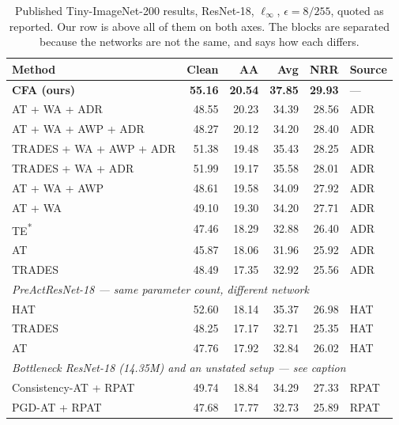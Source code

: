 \documentclass{article} %
\theoremstyle{plain}
\begin{document}
\begin{table}[!htbp]
  \centering \small \setlength{\tabcolsep}{4.5pt}
  \caption{Published Tiny-ImageNet-200 results, ResNet-18, $\ell_\infty$, $\epsilon = 8/255$, quoted as
  reported. Our row is above all of them on both axes. The blocks are separated because the networks
  are not the same, and  says how each differs.}
  \label{tab:published_tin}
  \begin{tabular}{lrrrrl}
    \toprule
    Method & Clean & AA & Avg & NRR & Source \\
    \midrule
    \textbf{CFA (ours)}        & \textbf{55.16} & \textbf{20.54} & \textbf{37.85} & \textbf{29.93} & --- \\
    \midrule
    AT + WA + ADR              & 48.55 & 20.23 & 34.39 & 28.56 & ADR \\
    AT + WA + AWP + ADR        & 48.27 & 20.12 & 34.20 & 28.40 & ADR \\
    TRADES + WA + AWP + ADR    & 51.38 & 19.48 & 35.43 & 28.25 & ADR \\
    TRADES + WA + ADR          & 51.99 & 19.17 & 35.58 & 28.01 & ADR \\
    AT + WA + AWP              & 48.61 & 19.58 & 34.09 & 27.92 & ADR \\
    AT + WA                    & 49.10 & 19.30 & 34.20 & 27.71 & ADR \\
    TE\textsuperscript{*}      & 47.46 & 18.29 & 32.88 & 26.40 & ADR \\
    AT                         & 45.87 & 18.06 & 31.96 & 25.92 & ADR \\
    TRADES                     & 48.49 & 17.35 & 32.92 & 25.56 & ADR \\
    \midrule
    \multicolumn{6}{l}{\emph{PreActResNet-18 --- same parameter count, different network}} \\
    HAT                        & 52.60 & 18.14 & 35.37 & 26.98 & HAT \\
    TRADES                     & 48.25 & 17.17 & 32.71 & 25.35 & HAT \\
    AT                         & 47.76 & 17.92 & 32.84 & 26.02 & HAT \\
    \midrule
    \multicolumn{6}{l}{\emph{Bottleneck ResNet-18 (14.35M) and an unstated setup --- see caption}} \\
    Consistency-AT + RPAT      & 49.74 & 18.84 & 34.29 & 27.33 & RPAT \\
    PGD-AT + RPAT              & 47.68 & 17.77 & 32.73 & 25.89 & RPAT \\

\end{tabular}
\end{table}
\end{document}

